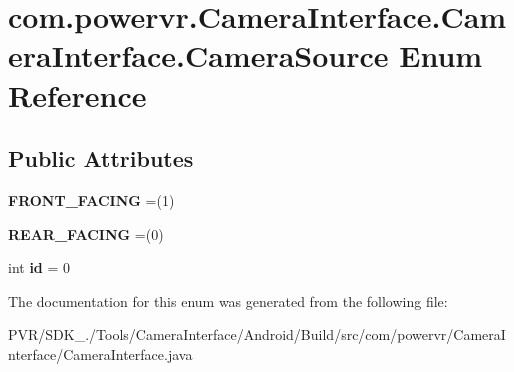 \hypertarget{enumcom_1_1powervr_1_1_camera_interface_1_1_camera_interface_1_1_camera_source}{\section{com.\+powervr.\+Camera\+Interface.\+Camera\+Interface.\+Camera\+Source Enum Reference}
\label{enumcom_1_1powervr_1_1_camera_interface_1_1_camera_interface_1_1_camera_source}
}
\subsection*{Public Attributes}
\begin{DoxyCompactItemize}
\item 
\hypertarget{enumcom_1_1powervr_1_1_camera_interface_1_1_camera_interface_1_1_camera_source_a3332224a084705d1554f3f09ccfd3cb3}{{\bfseries F\+R\+O\+N\+T\+\_\+\+F\+A\+C\+I\+N\+G} =(1)}\label{enumcom_1_1powervr_1_1_camera_interface_1_1_camera_interface_1_1_camera_source_a3332224a084705d1554f3f09ccfd3cb3}

\item 
\hypertarget{enumcom_1_1powervr_1_1_camera_interface_1_1_camera_interface_1_1_camera_source_a04291502e289a2f44c75d9e2c5debc78}{{\bfseries R\+E\+A\+R\+\_\+\+F\+A\+C\+I\+N\+G} =(0)}\label{enumcom_1_1powervr_1_1_camera_interface_1_1_camera_interface_1_1_camera_source_a04291502e289a2f44c75d9e2c5debc78}

\item 
\hypertarget{enumcom_1_1powervr_1_1_camera_interface_1_1_camera_interface_1_1_camera_source_a64635f65891e10800356880aa0083439}{int {\bfseries id} = 0}\label{enumcom_1_1powervr_1_1_camera_interface_1_1_camera_interface_1_1_camera_source_a64635f65891e10800356880aa0083439}

\end{DoxyCompactItemize}


The documentation for this enum was generated from the following file\+:\begin{DoxyCompactItemize}
\item 
P\+V\+R/\+S\+D\+K\+\_./\+Tools/\+Camera\+Interface/\+Android/\+Build/src/com/powervr/\+Camera\+Interface/Camera\+Interface.\+java\end{DoxyCompactItemize}
